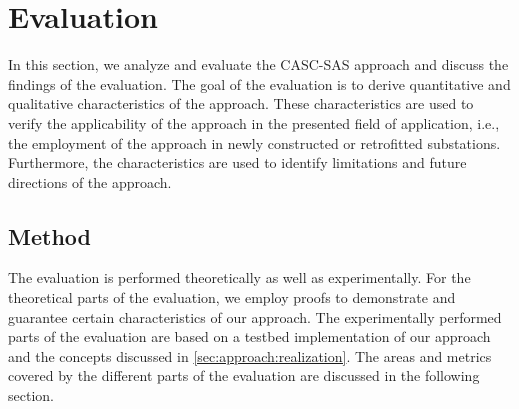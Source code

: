 \chapter{Evaluation}
\label{ch:evaluation}
In this section, we analyze and evaluate the CASC-SAS approach and discuss the findings of the evaluation.
The goal of the evaluation is to derive quantitative and qualitative characteristics of the approach.
These characteristics are used to verify the applicability of the approach in the presented field of application, i.e., the employment of the approach in newly constructed or retrofitted substations.
Furthermore, the characteristics are used to identify limitations and future directions of the approach.

\section{Method}
The evaluation is performed theoretically as well as experimentally.
For the theoretical parts of the evaluation, we employ proofs to demonstrate and guarantee certain characteristics of our approach.
The experimentally performed parts of the evaluation are based on a testbed implementation of our approach and the concepts discussed in \autoref{sec:approach:realization}.
The areas and metrics covered by the different parts of the evaluation are discussed in the following section.

